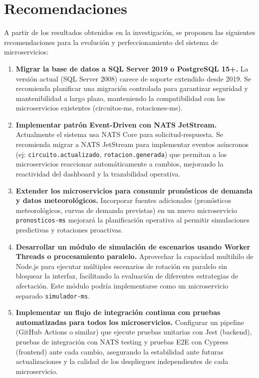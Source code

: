 \chapter*{Recomendaciones}
{}

A partir de los resultados obtenidos en la investigación, se proponen las siguientes recomendaciones para la evolución y perfeccionamiento del sistema de microservicios:

\begin{enumerate}
    \item \textbf{Migrar la base de datos a SQL Server 2019 o PostgreSQL 15+.} La versión actual (SQL Server 2008) carece de soporte extendido desde 2019. Se recomienda planificar una migración controlada para garantizar seguridad y mantenibilidad a largo plazo, manteniendo la compatibilidad con los microservicios existentes (circuitos-ms, rotaciones-ms).

    \item \textbf{Implementar patrón Event-Driven con NATS JetStream.} Actualmente el sistema usa NATS Core para solicitud-respuesta. Se recomienda migrar a NATS JetStream para implementar eventos asíncronos (ej: \texttt{circuito.actualizado}, \texttt{rotacion.generada}) que permitan a los microservicios reaccionar automáticamente a cambios, mejorando la reactividad del dashboard y la trazabilidad operativa.

    \item \textbf{Extender los microservicios para consumir pronósticos de demanda y datos meteorológicos.} Incorporar fuentes adicionales (pronósticos meteorológicos, curvas de demanda previstas) en un nuevo microservicio \texttt{pronosticos-ms} mejorará la planificación operativa al permitir simulaciones predictivas y rotaciones proactivas.

    \item \textbf{Desarrollar un módulo de simulación de escenarios usando Worker Threads o procesamiento paralelo.} Aprovechar la capacidad multihilo de Node.js para ejecutar múltiples escenarios de rotación en paralelo sin bloquear la interfaz, facilitando la evaluación de diferentes estrategias de afectación. Este módulo podría implementarse como un microservicio separado \texttt{simulador-ms}.

    \item \textbf{Implementar un flujo de integración continua con pruebas automatizadas para todos los microservicios.} Configurar un pipeline (GitHub Actions o similar) que ejecute pruebas unitarias con Jest (backend), pruebas de integración con NATS testing y pruebas E2E con Cypress (frontend) ante cada cambio, asegurando la estabilidad ante futuras actualizaciones y la calidad de los despliegues independientes de cada microservicio.


\end{enumerate}
